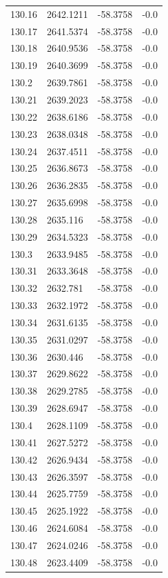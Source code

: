 \begin{table}[H]
\begin{tabular}{llll}
130.16 & 2642.1211 & -58.3758 & -0.0 \\
130.17 & 2641.5374 & -58.3758 & -0.0 \\
130.18 & 2640.9536 & -58.3758 & -0.0 \\
130.19 & 2640.3699 & -58.3758 & -0.0 \\
130.2 & 2639.7861 & -58.3758 & -0.0 \\
130.21 & 2639.2023 & -58.3758 & -0.0 \\
130.22 & 2638.6186 & -58.3758 & -0.0 \\
130.23 & 2638.0348 & -58.3758 & -0.0 \\
130.24 & 2637.4511 & -58.3758 & -0.0 \\
130.25 & 2636.8673 & -58.3758 & -0.0 \\
130.26 & 2636.2835 & -58.3758 & -0.0 \\
130.27 & 2635.6998 & -58.3758 & -0.0 \\
130.28 & 2635.116 & -58.3758 & -0.0 \\
130.29 & 2634.5323 & -58.3758 & -0.0 \\
130.3 & 2633.9485 & -58.3758 & -0.0 \\
130.31 & 2633.3648 & -58.3758 & -0.0 \\
130.32 & 2632.781 & -58.3758 & -0.0 \\
130.33 & 2632.1972 & -58.3758 & -0.0 \\
130.34 & 2631.6135 & -58.3758 & -0.0 \\
130.35 & 2631.0297 & -58.3758 & -0.0 \\
130.36 & 2630.446 & -58.3758 & -0.0 \\
130.37 & 2629.8622 & -58.3758 & -0.0 \\
130.38 & 2629.2785 & -58.3758 & -0.0 \\
130.39 & 2628.6947 & -58.3758 & -0.0 \\
130.4 & 2628.1109 & -58.3758 & -0.0 \\
130.41 & 2627.5272 & -58.3758 & -0.0 \\
130.42 & 2626.9434 & -58.3758 & -0.0 \\
130.43 & 2626.3597 & -58.3758 & -0.0 \\
130.44 & 2625.7759 & -58.3758 & -0.0 \\
130.45 & 2625.1922 & -58.3758 & -0.0 \\
130.46 & 2624.6084 & -58.3758 & -0.0 \\
130.47 & 2624.0246 & -58.3758 & -0.0 \\
130.48 & 2623.4409 & -58.3758 & -0.0 \\

\end{tabular}
\end{table}
